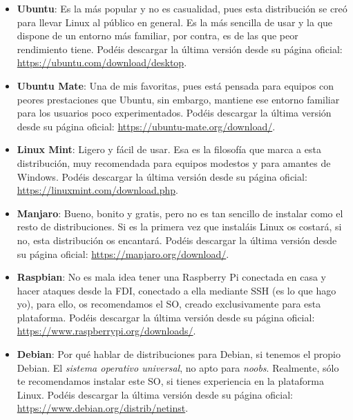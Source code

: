 \begin{itemize}
    \item \textbf{Ubuntu}: Es la más popular y no es casualidad, pues esta distribución se creó para llevar Linux al público en general. Es la más sencilla de usar y la que dispone de un entorno más familiar, por contra, es de las que peor rendimiento tiene.
    \newline Podéis descargar la última versión desde su página oficial: \newline \url{https://ubuntu.com/download/desktop}. 
    
    \item \textbf{Ubuntu Mate}: Una de mis favoritas, pues está pensada para equipos con peores prestaciones que Ubuntu, sin embargo, mantiene ese entorno familiar para los usuarios poco experimentados.
    \newline Podéis descargar la última versión desde su página oficial: \newline \url{https://ubuntu-mate.org/download/}.
    
    \item \textbf{Linux Mint}: Ligero y fácil de usar. Esa es la filosofía que marca a esta distribución, muy recomendada para equipos modestos y para amantes de Windows.
    \newline Podéis descargar la última versión desde su página oficial: \newline \url{https://linuxmint.com/download.php}.
     
    \item \textbf{Manjaro}: Bueno, bonito y gratis, pero no es tan sencillo de instalar como el resto de distribuciones. Si es la primera vez que instaláis Linux os costará, si no, esta distribución os encantará.
    \newline Podéis descargar la última versión desde su página oficial: \newline \url{https://manjaro.org/download/}.
     
    \item \textbf{Raspbian}: No es mala idea tener una Raspberry Pi conectada en casa y hacer ataques desde la FDI, conectado a ella mediante SSH (es lo que hago yo), para ello, os recomendamos el SO, creado exclusivamente para esta plataforma.
    \newline Podéis descargar la última versión desde su página oficial: \newline \url{https://www.raspberrypi.org/downloads/}.
     
    \item \textbf{Debian}: Por qué hablar de distribuciones para Debian, si tenemos el propio Debian. El \textit{sistema operativo universal}, no apto para \textit{noobs}. Realmente, sólo te recomendamos instalar este SO, si tienes experiencia en la plataforma Linux.
    \newline Podéis descargar la última versión desde su página oficial: \newline \url{https://www.debian.org/distrib/netinst}.
   
\end{itemize}

